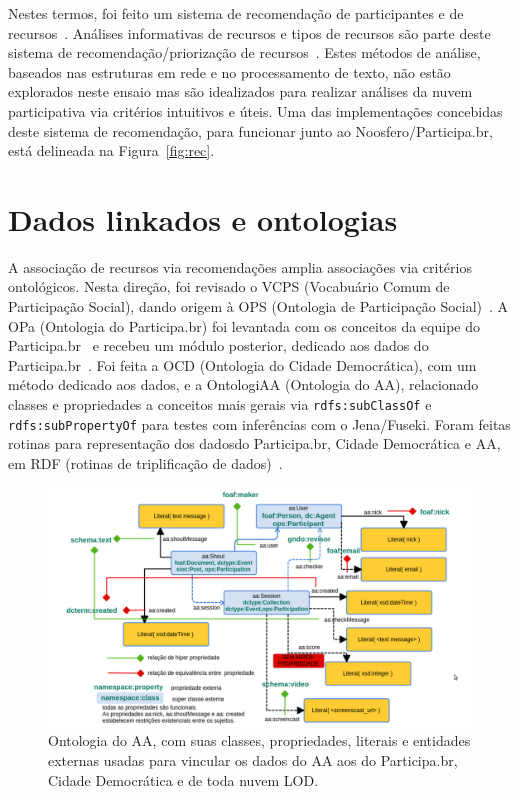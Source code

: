 \documentclass[a4paper, 11pt]{article} %
\begin{document}
Nestes termos, foi feito um sistema de recomendação de participantes e de recursos~\cite{pnud4}. Análises informativas de recursos e tipos de recursos são parte deste sistema de recomendação/priorização de recursos~\cite{pnud3}. Estes métodos de análise, baseados nas estruturas em rede e no processamento de texto, não estão explorados neste ensaio mas são idealizados para realizar análises da nuvem participativa via critérios intuitivos e úteis.
 Uma das implementações concebidas deste sistema de recomendação, para funcionar junto ao Noosfero/Participa.br, está delineada na Figura~\ref{fig:rec}.



\section*{Dados linkados e ontologias}
A associação de recursos via recomendações amplia associações via critérios ontológicos. Nesta direção, foi revisado o VCPS (Vocabuário Comum de Participação Social), dando origem à OPS (Ontologia de Participação Social)~\cite{OPS}. A OPa (Ontologia do Participa.br) foi levantada com os conceitos da equipe do Participa.br~\cite{OPA} e recebeu um módulo posterior, dedicado aos dados do Participa.br~\cite{pnud5}. Foi feita a OCD (Ontologia do Cidade Democrática), com um método dedicado aos dados, e a OntologiAA (Ontologia do AA), relacionado classes e propriedades a conceitos mais gerais via \texttt{rdfs:subClassOf} e \texttt{rdfs:subPropertyOf} para testes com inferências com o Jena/Fuseki. Foram feitas rotinas para representação dos dadosdo Participa.br, Cidade Democrática e AA, em RDF (rotinas de triplificação de dados)~\cite{pnud5}.
\begin{figure}[h!]
  \centering
    \includegraphics[width=1.\textwidth]{ontologiaa.png}
  \caption{\small Ontologia do AA, com suas classes, propriedades, literais e entidades externas usadas para vincular os dados do AA aos do Participa.br, Cidade Democrática e de toda nuvem LOD.}\label{fig:ontologiaa}
\end{figure}
\end{document}
